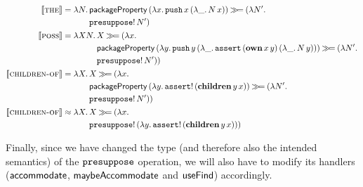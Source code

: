 \begin{align*}
  \llbracket \textsc{the} \rrbracket &= \lambda N.\, \begin{aligned}[t]
      &\mathsf{packageProperty}\,(\lambda x.\, \mathtt{push}\,x\,(\lambda \_.\, N\,x)) \mathbin{\gg\!=} (\lambda N'.\,  \\
      &\mathtt{presuppose}!\,N')
    \end{aligned} \\
  \llbracket \textsc{poss} \rrbracket &= \lambda X N.\, \begin{aligned}[t]
      &X \mathbin{\gg\!=} (\lambda x.\,  \\
      &\mathsf{packageProperty}\,(\lambda y.\, \mathtt{push}\,y\,(\lambda \_.\, \mathtt{assert}\,(\textbf{own}\,x\,y)\,(\lambda \_.\, N\,y))) \mathbin{\gg\!=} (\lambda N'.\,  \\
      &\mathtt{presuppose}!\,N'))
    \end{aligned} \\
  \llbracket \textsc{children-of} \rrbracket &= \lambda X.\, \begin{aligned}[t]
      &X \mathbin{\gg\!=} (\lambda x.\,  \\
      &\mathsf{packageProperty}\,(\lambda y.\, \mathtt{assert}!\,(\textbf{children}\,y\,x)) \mathbin{\gg\!=} (\lambda N'.\,  \\
      &\mathtt{presuppose}!\,N'))
    \end{aligned} \\
  \llbracket \textsc{children-of} \rrbracket &\approx \lambda X.\, \begin{aligned}[t]
      &X \mathbin{\gg\!=} (\lambda x.\,  \\
      &\mathtt{presuppose}!\,(\lambda y.\, \mathtt{assert}!\,(\textbf{children}\,y\,x)))
    \end{aligned}
\end{align*}

Finally, since we have changed the type (and therefore also the intended
semantics) of the $\mathtt{presuppose}$ operation, we will also have to modify
its handlers ($\mathsf{accommodate}$, $\mathsf{maybeAccommodate}$ and $\mathsf{useFind}$)
accordingly.


